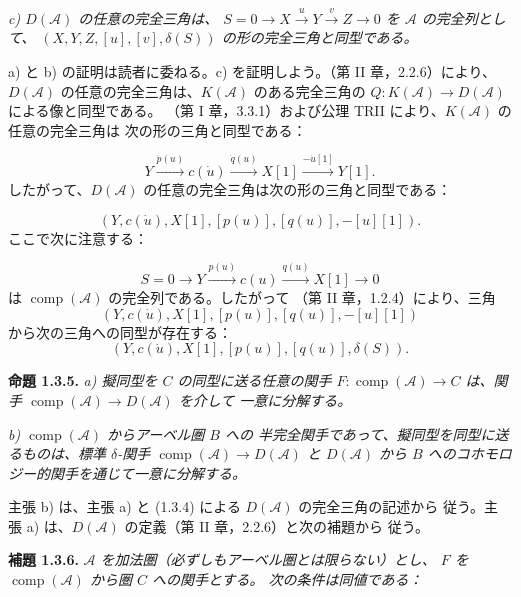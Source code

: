 \clearpage
{}%
\begingroup\small\setlength{\parskip}{0pt}\setlength{\emergencystretch}{1.5em}
\setlength{\abovedisplayskip}{4pt plus 2pt minus 2pt}%
\setlength{\belowdisplayskip}{4pt plus 2pt minus 2pt}%

\noindent\textit{c) $D(\mathcal A)$ の任意の完全三角は、
$S=0\longrightarrow X\xrightarrow{u}Y\xrightarrow{v}Z\longrightarrow0$
を $\mathcal A$ の完全列として、
$(X,Y,Z,[u],[v],\delta(S))$ の形の完全三角と同型である。}

a) と b) の証明は読者に委ねる。c) を証明しよう。（第 II 章，2.2.6）により、
$D(\mathcal A)$ の任意の完全三角は、$K(\mathcal A)$ のある完全三角の
$Q\colon K(\mathcal A)\longrightarrow D(\mathcal A)$ による像と同型である。
（第 I 章，3.3.1）および公理 TRII により、$K(\mathcal A)$ の任意の完全三角は
次の形の三角と同型である：

\[
Y\xrightarrow{\dot{p}(u)}c(\dot u)
\xrightarrow{\dot{q}(u)}X[1]
\xrightarrow{-\dot u[1]}Y[1].
\]
したがって、$D(\mathcal A)$ の任意の完全三角は次の形の三角と同型である：

\[
(Y,c(\dot u),X[1],[p(u)],[q(u)],-[u][1]).
\]
ここで次に注意する：

\[
S=0\longrightarrow Y\xrightarrow{p(u)}c(u)
\xrightarrow{q(u)}X[1]\longrightarrow0
\]
は $\operatorname{comp}(\mathcal A)$ の完全列である。したがって
（第 II 章，1.2.4）により、三角
\[
(Y,c(\dot u),X[1],[p(u)],[q(u)],-[u][1])
\]
から次の三角への同型が存在する：
\[
(Y,c(\dot u),X[1],[p(u)],[q(u)],\delta(S)).
\]

\medskip\noindent\textbf{命題 1.3.5.}\quad
\textit{a) 擬同型を $C$ の同型に送る任意の関手
$F\colon\operatorname{comp}(\mathcal A)\longrightarrow C$ は、関手
$\operatorname{comp}(\mathcal A)\longrightarrow D(\mathcal A)$ を介して
一意に分解する。}

\noindent\textit{b) $\operatorname{comp}(\mathcal A)$ からアーベル圏 $B$ への
半完全関手であって、擬同型を同型に送るものは、標準 $\delta$-関手
$\operatorname{comp}(\mathcal A)\longrightarrow D(\mathcal A)$ と
$D(\mathcal A)$ から $B$ へのコホモロジー的関手を通じて一意に分解する。}

主張 b) は、主張 a) と (1.3.4) による $D(\mathcal A)$ の完全三角の記述から
従う。主張 a) は、$D(\mathcal A)$ の定義（第 II 章，2.2.6）と次の補題から
従う。

\medskip\noindent\textbf{補題 1.3.6.}\quad
\textit{$\mathcal A$ を加法圏（必ずしもアーベル圏とは限らない）とし、
$F$ を $\operatorname{comp}(\mathcal A)$ から圏 $C$ への関手とする。
次の条件は同値である：}
\endgroup
